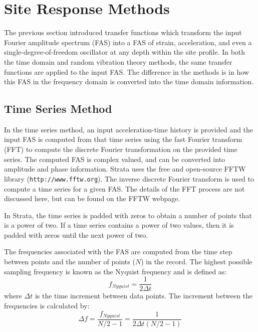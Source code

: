 \documentclass[11pt]{report}
\begin{document}
\section{Site Response Methods}\label{ch:siteResponse:methods}
The previous section introduced transfer functions which transform the input Fourier amplitude
spectrum (FAS) into a FAS of strain, acceleration, and even a single-degree-of-freedom oscillator at
any depth within the site profile.  In both the time domain and random vibration theory methods, the
same transfer functions are applied to the input FAS.  The difference in the methods is in how this
FAS in the frequency domain is converted into the time domain information.

\subsection{Time Series Method}\label{ch:siteResponse:methods:timeSeries}
In the time series method, an input acceleration-time history is provided and the input FAS is
computed from that time series using the fast Fourier transform (FFT)
to compute the discrete Fourier transformation on the provided
time series.  The computed FAS is complex valued, and can be converted into amplitude and phase
information.  Strata uses the free and open-source FFTW library (\texttt{http://www.fftw.org}).
The inverse discrete Fourier transform is used to compute a time series for a given FAS.  The
details of the FFT process are not discussed here, but can be found on the FFTW webpage.

In Strata, the time series is padded with zeros to obtain a number of points that is a power of two.
If a time series contains a power of two values, then it is padded with zeros until the next power
of two.

The frequencies associated with the FAS are computed from the time step between points and the
number of points ($N$) in the record.  The highest possible sampling frequency is known as the
Nyquist frequency and is defined as:
\begin{equation}
  f_{Nyquist} = \frac{1}{2 \Delta t}
\end{equation}
where $\Delta t$ is the time increment between data points.  The increment between the frequencies
is calculated by:
\begin{equation}
  \Delta f = \frac{f_{Nyquist}}{N/2-1} = \frac{1}{ 2 \Delta t \left( N/2 - 1 \right)}
\end{equation}
\end{document}
